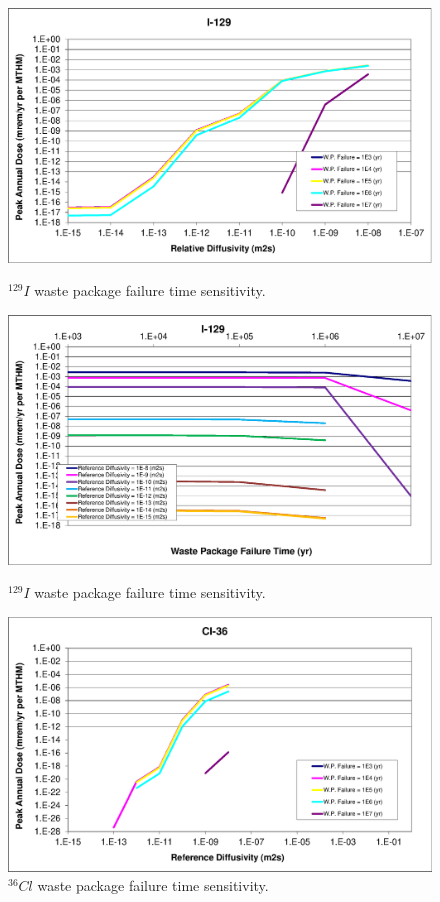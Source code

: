 \begin{figure}[ht!]
\centering
\begin{minipage}[b]{0.45\linewidth}
\includegraphics[width=\linewidth]{./chapters/nuclide_sensitivity/clay/WPFailExtended/I-129.eps}
\caption{$^{129}I$ waste package failure time sensitivity. }
\label{fig:WPFailI129}

\includegraphics[width=\linewidth]{./chapters/nuclide_sensitivity/clay/WPFailExtended/I-129-WPFail.eps}
\caption{$^{129}I$ waste package failure time sensitivity. }
\label{fig:WPFailI129}

\end{minipage}
\hspace{0.05\linewidth}
\begin{minipage}[b]{0.45\linewidth}
\includegraphics[width=\linewidth]{./chapters/nuclide_sensitivity/clay/WPFailExtended/Cl-36.eps}
\caption{$^{36}Cl$ waste package failure time sensitivity. }
\label{fig:WPFailCl36}


\end{minipage}
\end{figure}
